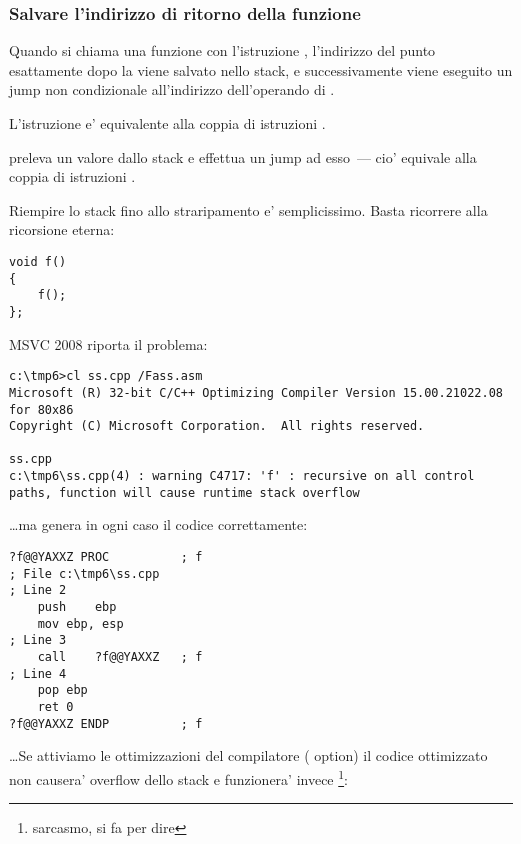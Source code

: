 \subsubsection{Salvare l'indirizzo di ritorno della funzione}


Quando si chiama una funzione con l'istruzione \CALL, l'indirizzo del punto esattamente dopo la \CALL viene salvato nello stack, e successivamente
viene eseguito un jump non condizionale all'indirizzo dell'operando di \CALL.

L'istruzione \CALL e' equivalente alla coppia di istruzioni .

\RET preleva un valore dallo stack e effettua un jump ad esso~--- cio' equivale alla coppia di istruzioni .

\myindex{\Recursion}

Riempire lo stack fino allo straripamento e' semplicissimo. Basta ricorrere alla ricorsione eterna:

\begin{lstlisting}[style=customc]
void f()
{
	f();
};
\end{lstlisting}

MSVC 2008 riporta il problema:

\begin{lstlisting}
c:\tmp6>cl ss.cpp /Fass.asm
Microsoft (R) 32-bit C/C++ Optimizing Compiler Version 15.00.21022.08 for 80x86
Copyright (C) Microsoft Corporation.  All rights reserved.

ss.cpp
c:\tmp6\ss.cpp(4) : warning C4717: 'f' : recursive on all control paths, function will cause runtime stack overflow
\end{lstlisting}

\dots ma genera in ogni caso il codice correttamente:

\begin{lstlisting}[style=customasmx86]
?f@@YAXXZ PROC			; f
; File c:\tmp6\ss.cpp
; Line 2
	push	ebp
	mov	ebp, esp
; Line 3
	call	?f@@YAXXZ	; f
; Line 4
	pop	ebp
	ret	0
?f@@YAXXZ ENDP			; f
\end{lstlisting}

\dots Se attiviamo le ottimizzazioni del compilatore (\TT{\Ox} option) il codice ottimizzato non causera' overflow dello stack 
e funzionera' invece \footnote{sarcasmo, si fa per dire}:

